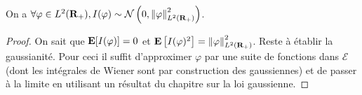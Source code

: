 	\begin{pop}
		On a $\forall \varphi \in L^2(\mathbf{R}_+), I(\varphi) \sim \mathcal{N} \left( 0, \left\lVert\varphi\right\rVert_{L^2(\mathbf{R}_+)}^2 \right)$.
	\end{pop}
	
	\begin{proof}
		On sait que $\mathbf{E}[I(\varphi)] = 0$ et $\mathbf{E} \left[ I(\varphi)^2 \right] = \left\lVert\varphi\right\rVert^2_{L^2(\mathbf{R}_+)}$.
		Reste à établir la gaussianité.
		Pour ceci il suffit d'approximer $\varphi$ par une suite de fonctions dans $\mathcal{E}$ (dont les intégrales de Wiener sont par construction des gaussiennes) et de passer à la limite en utilisant un résultat du chapitre sur la loi gaussienne.
	\end{proof}